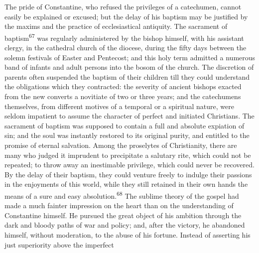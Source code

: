 


The pride of Constantine, who refused the privileges of a catechumen,
cannot easily be explained or excused; but the delay of his baptism may
be justified by the maxims and the practice of ecclesiastical
antiquity. The sacrament of baptism\textsuperscript{67} was regularly administered by
the bishop himself, with his assistant clergy, in the cathedral church
of the diocese, during the fifty days between the solemn festivals of
Easter and Pentecost; and this holy term admitted a numerous band of
infants and adult persons into the bosom of the church. The discretion
of parents often suspended the baptism of their children till they
could understand the obligations which they contracted: the severity of
ancient bishops exacted from the new converts a novitiate of two or
three years; and the catechumens themselves, from different motives of
a temporal or a spiritual nature, were seldom impatient to assume the
character of perfect and initiated Christians. The sacrament of baptism
was supposed to contain a full and absolute expiation of sin; and the
soul was instantly restored to its original purity, and entitled to the
promise of eternal salvation. Among the proselytes of Christianity,
there are many who judged it imprudent to precipitate a salutary rite,
which could not be repeated; to throw away an inestimable privilege,
which could never be recovered. By the delay of their baptism, they
could venture freely to indulge their passions in the enjoyments of
this world, while they still retained in their own hands the means of a
sure and easy absolution.\textsuperscript{68} The sublime theory of the gospel had made
a much fainter impression on the heart than on the understanding of
Constantine himself. He pursued the great object of his ambition
through the dark and bloody paths of war and policy; and, after the
victory, he abandoned himself, without moderation, to the abuse of his
fortune. Instead of asserting his just superiority above the imperfect
